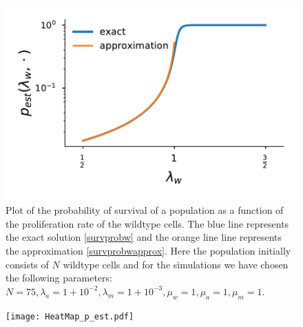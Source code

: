 \documentclass[11pt,a4paper]{article}
\begin{document}
\begin{figure}[!t]
 \vspace*{1\baselineskip}
\includegraphics[width=1\textwidth]{SurvPlot.pdf}
\caption{Plot of the probability of survival of a population as a function of the proliferation rate of the wildtype cells. The blue line represents the exact solution \eqref{survprobw} and the orange line line represents the approximation \eqref{survprobwapprox}. Here the population initially consists of $N$ wildtype cells and for the simulations we have chosen the following parameters: $N=75, \lambda_a=1+10^{-2},\lambda_m=1+10^{-3},\mu_w=1,\mu_a=1,\mu_m=1.$}
\label{SurvPlot}
\end{figure}

\begin{figure}[!t]
 \vspace*{1\baselineskip}
\texttt{[image: HeatMap\_p\_est.pdf]}
\caption{}
\label{SurvHeatMapPlot}
\end{figure}
\end{document}

